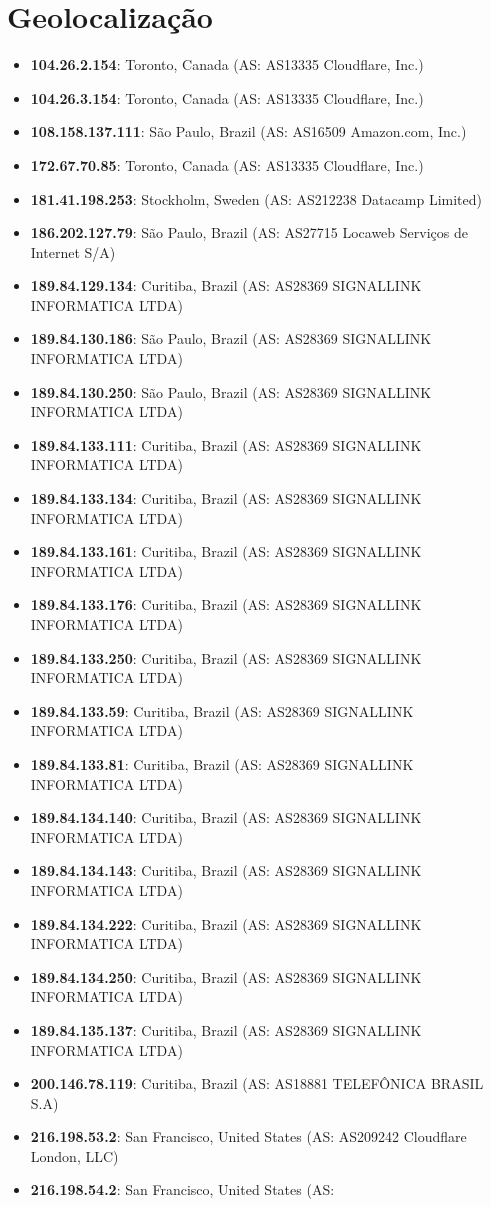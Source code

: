
\section{Geolocalização}
\begin{itemize}
\item \textbf{104.26.2.154}: Toronto, Canada (AS: AS13335 Cloudflare, Inc.)\item \textbf{104.26.3.154}: Toronto, Canada (AS: AS13335 Cloudflare, Inc.)\item \textbf{108.158.137.111}: São Paulo, Brazil (AS: AS16509 Amazon.com, Inc.)\item \textbf{172.67.70.85}: Toronto, Canada (AS: AS13335 Cloudflare, Inc.)\item \textbf{181.41.198.253}: Stockholm, Sweden (AS: AS212238 Datacamp Limited)\item \textbf{186.202.127.79}: São Paulo, Brazil (AS: AS27715 Locaweb Serviços de Internet S/A)\item \textbf{189.84.129.134}: Curitiba, Brazil (AS: AS28369 SIGNALLINK INFORMATICA LTDA)\item \textbf{189.84.130.186}: São Paulo, Brazil (AS: AS28369 SIGNALLINK INFORMATICA LTDA)\item \textbf{189.84.130.250}: São Paulo, Brazil (AS: AS28369 SIGNALLINK INFORMATICA LTDA)\item \textbf{189.84.133.111}: Curitiba, Brazil (AS: AS28369 SIGNALLINK INFORMATICA LTDA)\item \textbf{189.84.133.134}: Curitiba, Brazil (AS: AS28369 SIGNALLINK INFORMATICA LTDA)\item \textbf{189.84.133.161}: Curitiba, Brazil (AS: AS28369 SIGNALLINK INFORMATICA LTDA)\item \textbf{189.84.133.176}: Curitiba, Brazil (AS: AS28369 SIGNALLINK INFORMATICA LTDA)\item \textbf{189.84.133.250}: Curitiba, Brazil (AS: AS28369 SIGNALLINK INFORMATICA LTDA)\item \textbf{189.84.133.59}: Curitiba, Brazil (AS: AS28369 SIGNALLINK INFORMATICA LTDA)\item \textbf{189.84.133.81}: Curitiba, Brazil (AS: AS28369 SIGNALLINK INFORMATICA LTDA)\item \textbf{189.84.134.140}: Curitiba, Brazil (AS: AS28369 SIGNALLINK INFORMATICA LTDA)\item \textbf{189.84.134.143}: Curitiba, Brazil (AS: AS28369 SIGNALLINK INFORMATICA LTDA)\item \textbf{189.84.134.222}: Curitiba, Brazil (AS: AS28369 SIGNALLINK INFORMATICA LTDA)\item \textbf{189.84.134.250}: Curitiba, Brazil (AS: AS28369 SIGNALLINK INFORMATICA LTDA)\item \textbf{189.84.135.137}: Curitiba, Brazil (AS: AS28369 SIGNALLINK INFORMATICA LTDA)\item \textbf{200.146.78.119}: Curitiba, Brazil (AS: AS18881 TELEFÔNICA BRASIL S.A)\item \textbf{216.198.53.2}: San Francisco, United States (AS: AS209242 Cloudflare London, LLC)\item \textbf{216.198.54.2}: San Francisco, United States (AS: 
\end{itemize}
